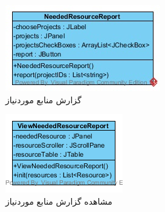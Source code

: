 \begin{figure}[H]
	\centering
	\begin{subfigure}[b]{0.3\textwidth}
		\includegraphics[width=\textwidth]{img/class-design/ui/NeededResourceReport.jpg}
		\caption{ گزارش منابع موردنیاز}
	\end{subfigure}
	\begin{subfigure}[b]{0.3\textwidth}
		\includegraphics[width=\textwidth]{img/class-design/ui/ViewNeededResourceReport.png}
		\caption{مشاهده گزارش منابع موردنیاز}
	\end{subfigure}
	\begin{subfigure}[b]{0.3\textwidth}

\end{subfigure}
\end{figure}

